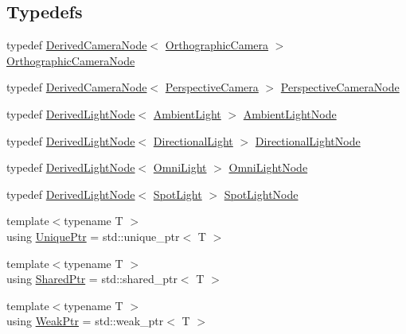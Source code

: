 \subsection*{Typedefs}
\begin{DoxyCompactItemize}
\item 
typedef \hyperlink{classmage_1_1_derived_camera_node}{Derived\+Camera\+Node}$<$ \hyperlink{classmage_1_1_orthographic_camera}{Orthographic\+Camera} $>$ \hyperlink{namespacemage_a2ba71e84d4a4fb1e4a7160800c53f519}{Orthographic\+Camera\+Node}
\item 
typedef \hyperlink{classmage_1_1_derived_camera_node}{Derived\+Camera\+Node}$<$ \hyperlink{classmage_1_1_perspective_camera}{Perspective\+Camera} $>$ \hyperlink{namespacemage_af3a338f28772b91cf6d7cb85df6f4bb9}{Perspective\+Camera\+Node}
\item 
typedef \hyperlink{classmage_1_1_derived_light_node}{Derived\+Light\+Node}$<$ \hyperlink{classmage_1_1_ambient_light}{Ambient\+Light} $>$ \hyperlink{namespacemage_afdaa06d91a410fa9df6f1822c35d7fa2}{Ambient\+Light\+Node}
\item 
typedef \hyperlink{classmage_1_1_derived_light_node}{Derived\+Light\+Node}$<$ \hyperlink{classmage_1_1_directional_light}{Directional\+Light} $>$ \hyperlink{namespacemage_adb6db5310fa7164aed35fc396973c73b}{Directional\+Light\+Node}
\item 
typedef \hyperlink{classmage_1_1_derived_light_node}{Derived\+Light\+Node}$<$ \hyperlink{classmage_1_1_omni_light}{Omni\+Light} $>$ \hyperlink{namespacemage_a85082c7e15a2bbf19b1753b7de6c45db}{Omni\+Light\+Node}
\item 
typedef \hyperlink{classmage_1_1_derived_light_node}{Derived\+Light\+Node}$<$ \hyperlink{classmage_1_1_spot_light}{Spot\+Light} $>$ \hyperlink{namespacemage_a46c8f54b869a5dc07f520c600b9046bd}{Spot\+Light\+Node}
\item 
{\footnotesize template$<$typename T $>$ }\\using \hyperlink{namespacemage_a8c307fbcc33bce9b7f2aa4c26c3b95cf}{Unique\+Ptr} = std\+::unique\+\_\+ptr$<$ T $>$
\item 
{\footnotesize template$<$typename T $>$ }\\using \hyperlink{namespacemage_a1e01ae66713838a7a67d30e44c67703e}{Shared\+Ptr} = std\+::shared\+\_\+ptr$<$ T $>$
\item 
{\footnotesize template$<$typename T $>$ }\\using \hyperlink{namespacemage_aa159a63c0d58464bdf32dfe419dd5dc1}{Weak\+Ptr} = std\+::weak\+\_\+ptr$<$ T $>$

\end{DoxyCompactItemize}
